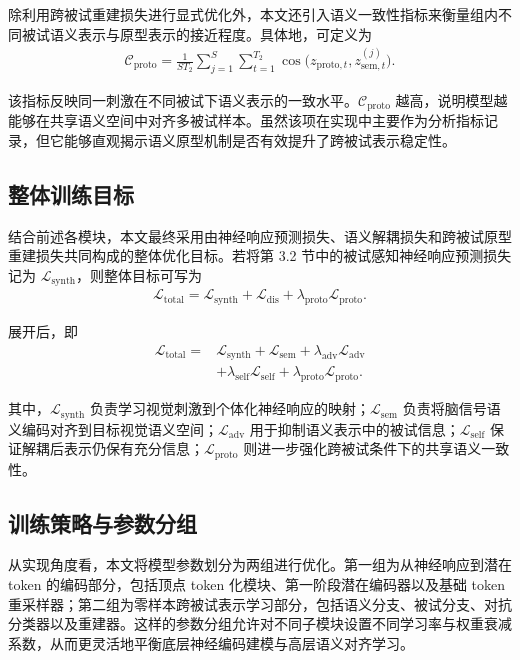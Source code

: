 除利用跨被试重建损失进行显式优化外，本文还引入语义一致性指标来衡量组内不同被试语义表示与原型表示的接近程度。具体地，可定义为
\begin{align}
  \mathcal{C}_{\mathrm{proto}} = \frac{1}{S T_2} \sum_{j=1}^{S} \sum_{t=1}^{T_2} \cos\bigl(z_{\mathrm{proto},t}, z_{\mathrm{sem},t}^{(j)}\bigr).
\end{align}

该指标反映同一刺激在不同被试下语义表示的一致水平。$\mathcal{C}_{\mathrm{proto}}$ 越高，说明模型越能够在共享语义空间中对齐多被试样本。虽然该项在实现中主要作为分析指标记录，但它能够直观揭示语义原型机制是否有效提升了跨被试表示稳定性。

\subsection{整体训练目标}

结合前述各模块，本文最终采用由神经响应预测损失、语义解耦损失和跨被试原型重建损失共同构成的整体优化目标。若将第 3.2 节中的被试感知神经响应预测损失记为 $\mathcal{L}_{\mathrm{synth}}$，则整体目标可写为
\begin{align}
  \mathcal{L}_{\mathrm{total}} = \mathcal{L}_{\mathrm{synth}} + \mathcal{L}_{\mathrm{dis}} + \lambda_{\mathrm{proto}} \mathcal{L}_{\mathrm{proto}}.
\end{align}

展开后，即
\begin{align}
  \mathcal{L}_{\mathrm{total}} ={}& \mathcal{L}_{\mathrm{synth}} + \mathcal{L}_{\mathrm{sem}} + \lambda_{\mathrm{adv}} \mathcal{L}_{\mathrm{adv}} \\
  &+ \lambda_{\mathrm{self}} \mathcal{L}_{\mathrm{self}} + \lambda_{\mathrm{proto}} \mathcal{L}_{\mathrm{proto}}.
\end{align}

其中，$\mathcal{L}_{\mathrm{synth}}$ 负责学习视觉刺激到个体化神经响应的映射；$\mathcal{L}_{\mathrm{sem}}$ 负责将脑信号语义编码对齐到目标视觉语义空间；$\mathcal{L}_{\mathrm{adv}}$ 用于抑制语义表示中的被试信息；$\mathcal{L}_{\mathrm{self}}$ 保证解耦后表示仍保有充分信息；$\mathcal{L}_{\mathrm{proto}}$ 则进一步强化跨被试条件下的共享语义一致性。

\subsection{训练策略与参数分组}

从实现角度看，本文将模型参数划分为两组进行优化。第一组为从神经响应到潜在 token 的编码部分，包括顶点 token 化模块、第一阶段潜在编码器以及基础 token 重采样器；第二组为零样本跨被试表示学习部分，包括语义分支、被试分支、对抗分类器以及重建器。这样的参数分组允许对不同子模块设置不同学习率与权重衰减系数，从而更灵活地平衡底层神经编码建模与高层语义对齐学习。

